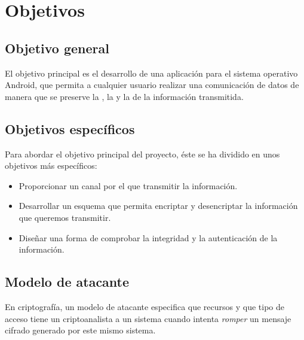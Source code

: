 
\chapter{Objetivos} %

\label{Chapter2}


\section{Objetivo general}

El objetivo principal es el desarrollo de una aplicación para el sistema operativo
Android, que permita a cualquier usuario realizar una comunicación de datos
de manera que se preserve la , la 
y la  de la información transmitida.


\section{Objetivos específicos}

Para abordar el objetivo principal del proyecto, éste se ha dividido en unos
objetivos más específicos:

\begin{itemize}
  \item Proporcionar un canal por el que transmitir la información.
  \item Desarrollar un esquema que permita encriptar y desencriptar la información que queremos transmitir.
  \item Diseñar una forma de comprobar la integridad y la autenticación de la información.
\end{itemize}


\section{Modelo de atacante}

En criptografía, un modelo de atacante especifica que recursos y que tipo de acceso
tiene un criptoanalista a un sistema cuando intenta \emph{romper} un mensaje cifrado
generado por este mismo sistema.

